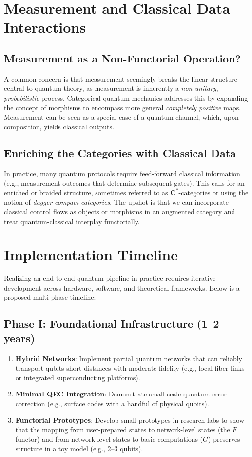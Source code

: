 \documentclass[12pt]{article}
\begin{document}
\section{Measurement and Classical Data Interactions}

\subsection{Measurement as a Non-Functorial Operation?}
A common concern is that measurement seemingly breaks the linear structure central to quantum theory, as measurement is inherently a \emph{non-unitary}, \emph{probabilistic} process. Categorical quantum mechanics addresses this by expanding the concept of morphisms to encompass more general \emph{completely positive} maps. Measurement can be seen as a special case of a quantum channel, which, upon composition, yields classical outputs.

\subsection{Enriching the Categories with Classical Data}
In practice, many quantum protocols require feed-forward classical information (e.g., measurement outcomes that determine subsequent gates). This calls for an enriched or braided structure, sometimes referred to as $\mathbf{C^*}$-categories or using the notion of \emph{dagger compact categories}. The upshot is that we can incorporate classical control flows as objects or morphisms in an augmented category and treat quantum-classical interplay functorially.

\section{Implementation Timeline}

Realizing an end-to-end quantum pipeline in practice requires iterative development across hardware, software, and theoretical frameworks. Below is a proposed multi-phase timeline:

\subsection*{Phase I: Foundational Infrastructure (1--2 years)}
\begin{enumerate}
\item \textbf{Hybrid Networks}: Implement partial quantum networks that can reliably transport qubits short distances with moderate fidelity (e.g., local fiber links or integrated superconducting platforms).
\item \textbf{Minimal QEC Integration}: Demonstrate small-scale quantum error correction (e.g., surface codes with a handful of physical qubits).
\item \textbf{Functorial Prototypes}: Develop small prototypes in research labs to show that the mapping from user-prepared states to network-level states (the $F$ functor) and from network-level states to basic computations ($G$) preserves structure in a toy model (e.g., 2--3 qubits).
\end{enumerate}
\end{document}

